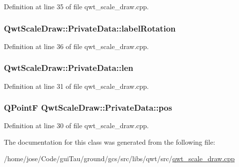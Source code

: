 Definition at line 35 of file qwt\-\_\-scale\-\_\-draw.\-cpp.

\hypertarget{class_qwt_scale_draw_1_1_private_data_a7b221a8d3ced4826d98d745d61f87d9b}{
\subsubsection[{label\-Rotation}]{ Qwt\-Scale\-Draw\-::\-Private\-Data\-::label\-Rotation}}\label{class_qwt_scale_draw_1_1_private_data_a7b221a8d3ced4826d98d745d61f87d9b}


Definition at line 36 of file qwt\-\_\-scale\-\_\-draw.\-cpp.

\hypertarget{class_qwt_scale_draw_1_1_private_data_a006435ca5b680e5be02ab9973694be8b}{
\subsubsection[{len}]{ Qwt\-Scale\-Draw\-::\-Private\-Data\-::len}}\label{class_qwt_scale_draw_1_1_private_data_a006435ca5b680e5be02ab9973694be8b}


Definition at line 31 of file qwt\-\_\-scale\-\_\-draw.\-cpp.

\hypertarget{class_qwt_scale_draw_1_1_private_data_a24d5c1e8eca8cf34248cbaf01dfd4b78}{
\subsubsection[{pos}]{\setlength{\rightskip}{0pt plus 5cm}Q\-Point\-F Qwt\-Scale\-Draw\-::\-Private\-Data\-::pos}}\label{class_qwt_scale_draw_1_1_private_data_a24d5c1e8eca8cf34248cbaf01dfd4b78}


Definition at line 30 of file qwt\-\_\-scale\-\_\-draw.\-cpp.



The documentation for this class was generated from the following file\-:\begin{DoxyCompactItemize}
\item 
/home/jose/\-Code/gui\-Tau/ground/gcs/src/libs/qwt/src/\hyperlink{qwt__scale__draw_8cpp}{qwt\-\_\-scale\-\_\-draw.\-cpp}\end{DoxyCompactItemize}
